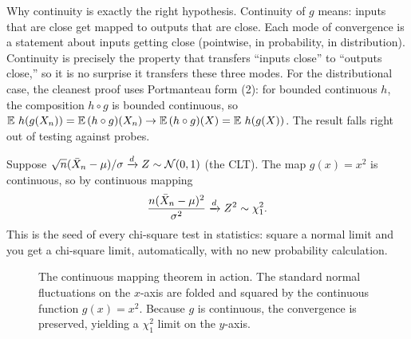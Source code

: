 \begin{whybox}
Why continuity is exactly the right hypothesis. Continuity of $g$ means: inputs that
are close get mapped to outputs that are close. Each mode of convergence is
a statement about inputs getting close (pointwise, in probability, in distribution).
Continuity is precisely the property that transfers ``inputs close'' to ``outputs close,'' so it is no surprise it transfers these three modes. For the distributional case,
the cleanest proof uses Portmanteau form (2): for bounded continuous $h$, the
composition $h\circ g$ is bounded continuous, so $\operatorname{\mathbb{E}}\,h(g(X_n))=\operatorname{\mathbb{E}}\,(h\circ g)(X_n)\to
\operatorname{\mathbb{E}}\,(h\circ g)(X)=\operatorname{\mathbb{E}}\,h(g(X))$. The result falls right out of testing against probes.
\end{whybox}

\begin{example}
\label{ch22:ex-chisq}
Suppose $\sqrt n(\bar X_n - \mu)/\sigma \xrightarrow{d} Z\sim\mathcal{N}(0,1)$ (the CLT). The map
$g(x)=x^2$ is continuous, so by continuous mapping
\[
  \frac{n(\bar X_n - \mu)^2}{\sigma^2} \xrightarrow{d} Z^2 \sim \chi^2_1.
\]
This is the seed of every chi-square test in statistics: square a normal limit and you
get a chi-square limit, automatically, with no new probability calculation.

\begin{figure}[H]
\centering
{}
\caption{The continuous mapping theorem in action. The standard normal fluctuations on the $x$-axis are folded and squared by the continuous function $g(x)=x^2$. Because $g$ is continuous, the convergence is preserved, yielding a $\chi^2_1$ limit on the $y$-axis.}
\label{ch22:fig-chisq-cmt}
\end{figure}
\end{example}

